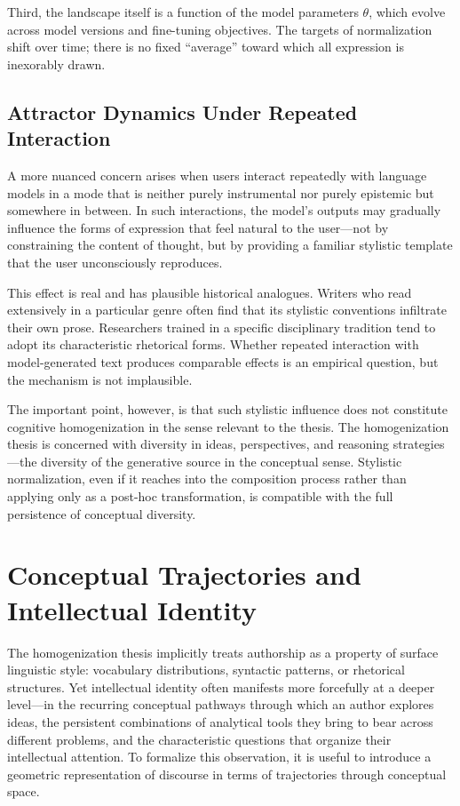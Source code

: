 \documentclass[12pt,a4paper]{article}
\theoremstyle{definition}
\theoremstyle{plain}
\theoremstyle{remark}
\begin{document}
Third, the landscape itself is a function of the model parameters $\theta$, which evolve
across model versions and fine-tuning objectives. The targets of normalization shift over
time; there is no fixed ``average'' toward which all expression is inexorably drawn.

\subsection{Attractor Dynamics Under Repeated Interaction}

A more nuanced concern arises when users interact repeatedly with language models in a mode
that is neither purely instrumental nor purely epistemic but somewhere in between. In such
interactions, the model's outputs may gradually influence the forms of expression that feel
natural to the user---not by constraining the content of thought, but by providing a familiar
stylistic template that the user unconsciously reproduces.

This effect is real and has plausible historical analogues. Writers who read extensively in a
particular genre often find that its stylistic conventions infiltrate their own prose.
Researchers trained in a specific disciplinary tradition tend to adopt its characteristic
rhetorical forms. Whether repeated interaction with model-generated text produces comparable
effects is an empirical question, but the mechanism is not implausible.

The important point, however, is that such stylistic influence does not constitute cognitive
homogenization in the sense relevant to the thesis. The homogenization thesis is concerned
with diversity in ideas, perspectives, and reasoning strategies---the diversity of the
generative source in the conceptual sense. Stylistic normalization, even if it reaches into
the composition process rather than applying only as a post-hoc transformation, is compatible
with the full persistence of conceptual diversity.

\section{Conceptual Trajectories and Intellectual Identity}
\label{sec:trajectories}

The homogenization thesis implicitly treats authorship as a property of surface linguistic
style: vocabulary distributions, syntactic patterns, or rhetorical structures. Yet
intellectual identity often manifests more forcefully at a deeper level---in the recurring
conceptual pathways through which an author explores ideas, the persistent combinations of
analytical tools they bring to bear across different problems, and the characteristic
questions that organize their intellectual attention. To formalize this observation, it is
useful to introduce a geometric representation of discourse in terms of trajectories through
conceptual space.
\end{document}
